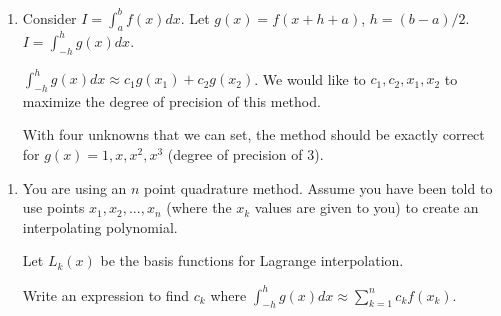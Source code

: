 \documentclass[12pt,letterpaper,noanswers]{exam}
\begin{document}
\begin{enumerate}[resume=classQ]
    \item Consider $I = \int_a^b f(x)dx$.  Let $g(x) = f(x+h+a)$, $h = (b-a)/2$.  $I = \int_{-h}^h g(x) dx$.
    
        $\int_{-h}^h g(x) dx \approx c_1 g(x_1) + c_2 g(x_2)$.  We would like to $c_1, c_2, x_1, x_2$ to maximize the degree of precision of this method.  
        
        With four unknowns that we can set, the method should be exactly correct for $g(x) = 1, x, x^2, x^3$ (degree of precision of $3$).
\end{enumerate}
\eject



\begin{enumerate}[resume=classQ]
\item You are using an $n$ point quadrature method.  Assume you have been told to use points $x_1, x_2, ..., x_n$ (where the $x_k$ values are given to you) to create an interpolating polynomial.

Let $L_k(x)$ be the basis functions for Lagrange interpolation.  

Write an expression to find $c_k$ where $\displaystyle\int_{-h}^h g(x) dx \approx \sum\limits_{k=1}^n c_k f(x_k)$.
\vspace{1in}

\end{enumerate}
\end{document}
